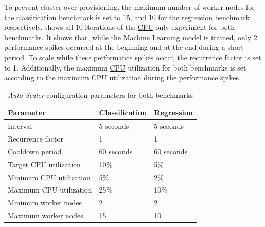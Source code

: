 To prevent cluster over-provisioning, the maximum number of worker nodes for the classification benchmark is set to 15, and 10 for the regression benchmark respectively.
 shows all 10 iterations of the \hyperlink{abbr:cpu}{CPU}-only experiment for both benchmarks. It shows that, while the Machine Learning model is trained, only 2 performance spikes occurred at the beginning and at the end during a short period. To scale while these performance spikes occur, the recurrence factor is set to 1. Additionally, the maximum \hyperlink{abbr:cpu}{CPU} utilization for both benchmarks is set according to the maximum \hyperlink{abbr:cpu}{CPU} utilization during the performance spikes.
\begin{table}[ht]
\centering
\begin{tabular}{@{}l|ll@{}}
\toprule
Parameter               & Classification & Regression \\ \midrule
Interval                & 5 seconds      & 5 seconds  \\
Recurrence factor       & 1              & 1          \\
Cooldown period         & 60 seconds     & 60 seconds \\
Target CPU utilization  & 10\%           & 5\%        \\
Minimum CPU utilization & 5\%            & 2\%       \\
Maximum CPU utilization & 25\%           & 10\%       \\
Minimum worker nodes    & 2              & 2         \\
Maximum worker nodes    & 15             & 10         \\ \bottomrule
\end{tabular}
\caption{\textit{Auto-Scaler} configuration parameters for both benchmarks}
\label{table:07_auto-scaler_config_parameter}
\end{table}


